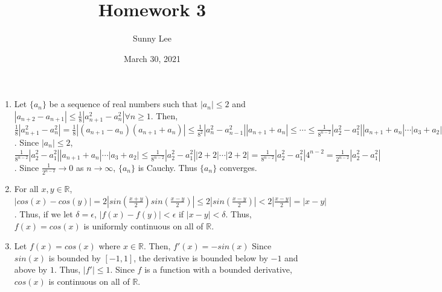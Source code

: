 \documentclass{article}
\title{Homework 3}
\author{Sunny Lee}
\date{March 30, 2021}
\newcommand{\rr}{\mathbb R}
\begin{document}
\begin{enumerate}
    \item Let $\{a_n\}$ be a sequence of real numbers such that $|a_n| \leq 2$ and 
    $|a_{n+2} - a_{n+1}| \leq \frac{1}{8}|a_{n+1}^2 - a_n^2| \forall n\geq 1$. Then, 
    $\frac{1}{8}|a_{n+1}^2 - a_n^2| = \frac{1}{8}|(a_{n+1} - a_n)(a_{n+1} + a_n)|
    \leq \frac{1}{8^2}|a_n^2 - a_{n-1}^2||a_{n+1} + a_n| \leq \cdots \leq 
    \frac{1}{8^{n-2}}|a_2^2 - a_1^2||a_{n+1}+a_n|\cdots |a_3 + a_2|$. 
    Since $|a_n|\leq 2$, $\frac{1}{8^{n-2}}|a_2^2 - a_1^2||a_{n+1}+a_n|\cdots |a_3 + a_2|
    \leq \frac{1}{8^{n-2}}|a_2^2 - a_1^2||2+2|\cdots |2 + 2| = 
    \frac{1}{8^{n-2}}|a_2^2 - a_1^2|4^{n-2} = \frac{1}{2^{n-2}}|a_2^2 - a_1^2|$. Since 
    $\frac{1}{2^{n-2}}\rightarrow 0$ as $n\rightarrow \infty$, $\{a_n\}$ is Cauchy. Thus
    $\{a_n\}$ converges.

    \item For all $x, y \in \rr$, $|cos(x) - cos(y)| = 2|sin(\frac{x+y}{2})
    sin(\frac{x-y}{2})| \leq 2|sin(\frac{x-y}{2})| < 2|\frac{x-y}{2}| = |x-y|$. Thus, 
    if we let $\delta = \epsilon$, $|f(x) - f(y)| < \epsilon$ if $|x-y| < \delta$. Thus, 
    $f(x) = cos(x)$ is uniformly continuous on all of $\rr$. 

    \item Let $f(x) = cos(x)$ where $x\in \rr$. Then, $f'(x) = -sin(x)$ Since $sin(x)$
    is bounded by $[-1, 1]$, the derivative is bounded below by $-1$ and above by $1$. 
    Thus, $|f'| \leq 1$. Since $f$ is a function with a bounded derivative, $cos(x)$
    is continuous on all of $\rr$. 


\end{enumerate}
\end{document}
